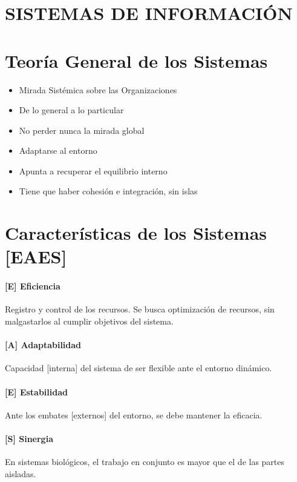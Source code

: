 \twocolumn 

\hypertarget{si}{%
\section{SISTEMAS DE INFORMACIÓN}\label{si}}

\hypertarget{teoruxeda-general-de-los-sistemas}{%
\section{Teoría General de los Sistemas}\label{teoruxeda-general-de-los-sistemas}}

\begin{itemize}
  \setlength\itemsep{-1em}
\item   Mirada Sistémica sobre las Organizaciones
\item   De lo general a lo particular
\item   No perder nunca la mirada global
\item   Adaptarse al entorno
\item   Apunta a recuperar el equilibrio interno
\item   Tiene que haber cohesión e integración, sin islas
\end{itemize}

\hypertarget{caracteruxedsticas-de-los-sistemas-eaes}{%
\section{Características de los Sistemas
{[}EAES{]}}\label{caracteruxedsticas-de-los-sistemas-eaes}}

\hypertarget{eficiencia}{%
\paragraph{{[}E{]} Eficiencia}\label{eficiencia}}
Registro y control de los recursos. Se busca optimización de recursos, sin malgastarlos al cumplir objetivos del sistema.
\hypertarget{adaptabilidad}{%
\paragraph{{[}A{]} Adaptabilidad}\label{adaptabilidad}}
Capacidad [interna] del sistema de ser flexible ante el  entorno dinámico.
\hypertarget{estabilidad}{%
\paragraph{{[}E{]} Estabilidad}\label{estabilidad}}
Ante los embates [externos] del entorno, se debe mantener la eficacia.
\hypertarget{sinergia}{%
\paragraph{{[}S{]} Sinergia}\label{sinergia}}
En sistemas biológicos, el trabajo en conjunto es mayor que el de las partes aisladas.

